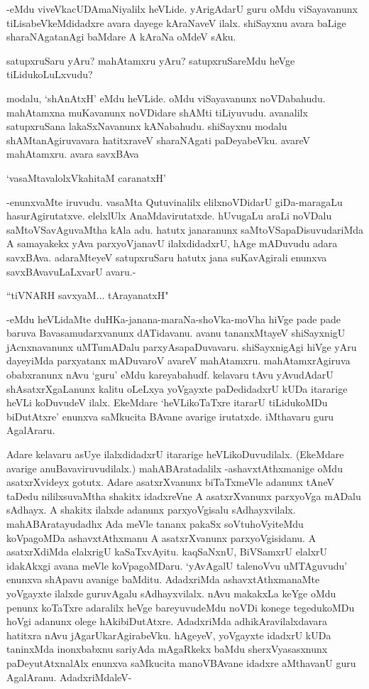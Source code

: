 -eMdu viveVkacUDAmaNiyalilx heVLide. yArigAdarU guru oMdu viSayavanunx tiLisabeVkeMdidadxre avara dayege kAraNaveV ilalx. shiSayxnu avara baLige sharaNAgatanAgi baMdare A kAraNa oMdeV sAku.

satupxruSaru yAru? mahAtamxru yAru? satupxruSareMdu heVge tiLidukoLuLxvudu?

modalu, `shAnAtxH' eMdu heVLide. oMdu viSayavanunx noVDabahudu. mahAtamxna muKavanunx noVDidare shAMti tiLiyuvudu. avanalilx satupxruSana lakaSxNavanunx kANabahudu. shiSayxnu modalu shAMtanAgiruvavara hatitxraveV sharaNAgati paDeyabeVku. avareV mahAtamxru. avara savxBAva

\begin{shloka}
`vasaMtavalolxVkahitaM caranatxH'
\end{shloka}

-enunxvaMte iruvudu. vasaMta Qutuvinalilx elilxnoVDidarU giDa-maragaLu hasurAgirutatxve. elelxlUlx AnaMdavirutatxde. hUvugaLu araLi noVDalu saMtoVSavAguvaMtha kAla adu. hatutx janaranunx saMtoVSapaDisuvudariMda A samayakekx yAva parxyoVjanavU ilalxdidadxrU, hAge mADuvudu adara savxBAva. adaraMteyeV satupxruSaru hatutx jana suKavAgirali enunxva savxBAvavuLaLxvarU avaru.-

\begin{shloka}
``tiVNARH savxyaM$\ldots$ tArayanatxH"
\end{shloka}

-eMdu heVLidaMte duHKa-janana-maraNa-shoVka-moVha hiVge pade pade baruva Bavasamudarxvanunx dATidavanu. avanu tananxMtayeV shiSayxnigU jAcnxnavanunx uMTumADalu parxyAsapaDuvavaru. shiSayxnigAgi hiVge yAru dayeyiMda parxyatanx mADuvaroV avareV mahAtamxru. mahAtamxrAgiruva obabxranunx nAvu `guru' eMdu kareyabahudf. kelavaru tAvu yAvudAdarU shAsatxrXgaLanunx kalitu oLeLxya yoVgayxte paDedidadxrU kUDa itararige heVLi koDuvudeV ilalx. EkeMdare `heVLikoTaTxre itararU tiLidukoMDu biDutAtxre' enunxva saMkucita BAvane avarige irutatxde. iMthavaru guru AgalAraru.

Adare kelavaru asUye ilalxdidadxrU itararige heVLikoDuvudilalx. (EkeMdare avarige anuBavaviruvudilalx.) mahABAratadalilx -ashavxtAthxmanige oMdu asatxrXvideyx gotutx. Adare asatxrXvanunx biTaTxmeVle adanunx tAneV taDedu nililxsuvaMtha shakitx idadxreVne A asatxrXvanunx parxyoVga mADalu sAdhayx. A shakitx ilalxde adanunx parxyoVgisalu sAdhayxvilalx. mahABAratayudadhx Ada meVle tananx pakaSx soVtuhoVyiteMdu koVpagoMDa ashavxtAthxmanu A asatxrXvanunx parxyoVgisidanu. A asatxrXdiMda elalxrigU kaSaTxvAyitu. kaqSaNxnU, BiVSamxrU elalxrU idakAkxgi avana meVle koVpagoMDaru. `yAvAgalU talenoVvu uMTAguvudu' enunxva shApavu avanige baMditu. AdadxriMda ashavxtAthxmanaMte yoVgayxte ilalxde guruvAgalu sAdhayxvilalx. nAvu makakxLa keYge oMdu penunx koTaTxre adaralilx heVge bareyuvudeMdu noVDi konege tegedukoMDu hoVgi adanunx olege hAkibiDutAtxre. AdadxriMda adhikAravilalxdavara hatitxra nAvu jAgarUkarAgirabeVku. hAgeyeV, yoVgayxte idadxrU kUDa taninxMda inonxbabxnu sariyAda mAgaRkekx baMdu sherxVyasasxnunx paDeyutAtxnalAlx enunxva saMkucita manoVBAvane idadxre aMthavanU guru AgalAranu. AdadxriMdaleV-

